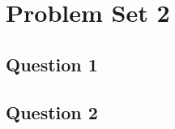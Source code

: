 \documentclass[titlepage]{article}
\begin{document}
\section{Problem Set 2}
\subsection{Question 1}

\subsection{Question 2}
\end{document}
